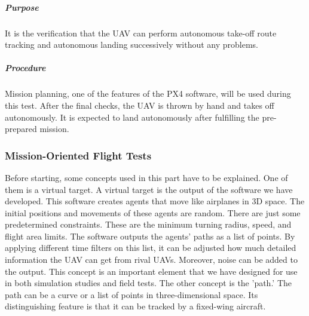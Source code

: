 \documentclass[12pt]{article}
\begin{document}
\subparagraph*{Purpose} It is the verification that the UAV can perform autonomous take-off route tracking and autonomous landing successively without any problems.

\subparagraph*{Procedure} Mission planning, one of the features of the PX4 software, will be used during this test. After the final checks, the UAV is thrown by hand and takes off autonomously. It is expected to land autonomously after fulfilling the pre-prepared mission.

\subsubsection[]{Mission-Oriented Flight Tests}

Before starting, some concepts used in this part have to be explained. One of them is a virtual target. A virtual target is the output of the software we have developed. This software creates agents that move like airplanes in 3D space. The initial positions and movements of these agents are random. There are just some predetermined constraints. These are the minimum turning radius, speed, and flight area limits. The software outputs the agents' paths as a list of points. By applying different time filters on this list, it can be adjusted how much detailed information the UAV can get from rival UAVs. Moreover, noise can be added to the output. This concept is an important element that we have designed for use in both simulation studies and field tests. The other concept is the 'path.' The path can be a curve or a list of points in three-dimensional space. Its distinguishing feature is that it can be tracked by a fixed-wing aircraft.
\end{document}

